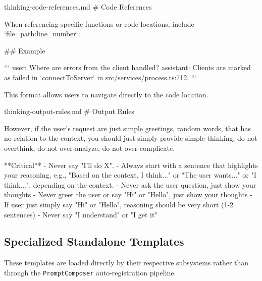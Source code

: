 \begin{prompttemplate}{thinking-code-references.md}
# Code References

When referencing specific functions or code locations, include
`file_path:line_number`:

## Example

```
user: Where are errors from the client handled?
assistant: Clients are marked as failed in `connectToServer` in
  src/services/process.ts:712.
```

This format allows users to navigate directly to the code location.
\end{prompttemplate}

\begin{prompttemplate}{thinking-output-rules.md}
# Output Rules

However, if the user's request are just simple greetings, random words,
that has no relation to the context, you should just simply provide simple
thinking, do not overthink, do not over-analyze, do not over-complicate.

**Critical**
- Never say "I'll do X".
- Always start with a sentence that highlights your reasoning, e.g.,
  "Based on the context, I think..." or "The user wants..." or
  "I think...", depending on the context.
- Never ask the user question, just show your thoughts
- Never greet the user or say "Hi" or "Hello", just show your thoughts
- If user just simply say "Hi" or "Hello", reasoning should be very short
  (1-2 sentences)
- Never say "I understand" or "I get it"
\end{prompttemplate}

\subsection{Specialized Standalone Templates}
\label{app:tpl_specialized}

These templates are loaded directly by their respective subsystems rather than through the \texttt{PromptComposer} auto-registration pipeline.

